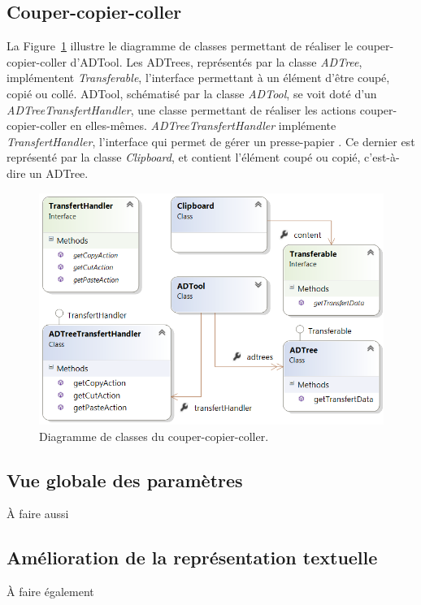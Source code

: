     \subsection{Couper-copier-coller}
		La {\sc Figure}~{\ref{fig:copiercoller}} illustre le diagramme de classes permettant de réaliser le couper-copier-coller d'ADTool. Les ADTrees, représentés par la classe \emph{ADTree}, implémentent \emph{Transferable}, l'interface permettant à un élément d'être coupé, copié ou collé. ADTool, schématisé par la classe \emph{ADTool}, se voit doté d'un \emph{ADTreeTransfertHandler}, une classe permettant de réaliser les actions couper-copier-coller en elles-mêmes. \emph{ADTreeTransfertHandler} implémente \emph{TransfertHandler}, l'interface qui permet de gérer un \og presse-papier \fg{}. Ce dernier est représenté par la classe \emph{Clipboard}, et contient l'élément coupé ou copié, c'est-à-dire un ADTree.
    	
    	\begin{figure}[H]
	        \centering
	        \includegraphics[height=0.6\textwidth]{figure/copiercoller.png}
	        \caption{Diagramme de classes du couper-copier-coller.}
	        \label{fig:copiercoller}
	    \end{figure}
	    
	\subsection{Vue globale des paramètres}
		À faire aussi
	
	\subsection{Amélioration de la représentation textuelle}
		À faire également
	  